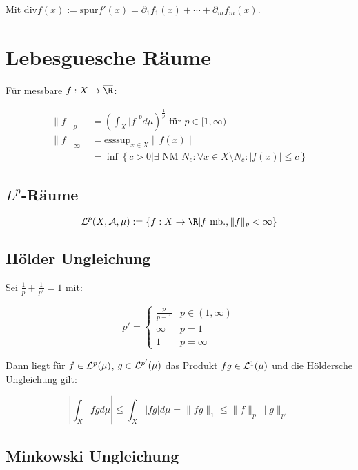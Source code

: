 Mit $\text{div} f(x) := \text{spur} f'(x) = \partial_1 f_1(x) + \cdots + \partial_m f_m(x)$.

\section*{Lebesguesche Räume}

Für messbare $f : X \to \overline\R$:

\vspace{-4mm}
\begin{align*}
\|f\|_p &= \left(\int_X |f|^p d\mu\right)^\frac{1}{p} \text{ für } p \in [1,\infty)\\
\|f\|_\infty &= \text{esssup}_{x \in X} \|f(x)\|\\
      &= \inf\left\{ c > 0 | \exists \text{ NM } N_c : \forall x \in X \setminus N_c : |f(x)| \leq c\right\}
\end{align*}

\subsection*{$L^p$-Räume}

$$\L^p(X,\A,\mu) := \{ f : X \to \R | f \text{ mb.}, \|f\|_p < \infty\}$$

\subsection*{Hölder Ungleichung}

Sei $\frac{1}{p} + \frac{1}{p'} = 1$ mit:

$$p' = \begin{cases}
	\frac{p}{p-1} & p \in (1, \infty) \\
	\infty        & p = 1 \\
	1        & p = \infty
\end{cases}$$

Dann liegt für $f \in \mathcal{L}^p(\mu)$, $g \in \mathcal{L}^{p'}(\mu)$ das Produkt $fg \in \mathcal{L}^1(\mu)$ und die Höldersche Ungleichung gilt:

\vspace{-4mm}
$$\left| \int_X fg d\mu \right| \leq \int_X |fg| d\mu = \|fg\|_1 \leq \|f\|_p \|g\|_{p'}$$

\subsection*{Minkowski Ungleichung}
